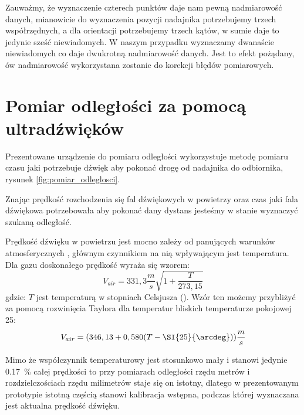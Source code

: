 Zauważmy, że wyznaczenie czterech punktów daje nam pewną nadmiarowość
danych, mianowicie do wyznaczenia pozycji nadajnika potrzebujemy trzech współrzędnych,
a dla orientacji potrzebujemy trzech kątów, w sumie daje to jedynie sześć niewiadomych.
W naszym przypadku wyznaczamy dwanaście niewiadomych co daje dwukrotną nadmiarowość danych.
Jest to efekt pożądany, ów nadmiarowość wykorzystana zostanie do korekcji błędów pomiarowych.


\section{Pomiar odległości za pomocą ultradźwięków}

Prezentowane urządzenie do pomiaru odległości wykorzystuje metodę pomiaru czasu jaki 
potrzebuje dźwięk aby pokonać drogę od nadajnika do odbiornika,
rysunek \ref{fig:pomiar_odleglosci}.

Znając prędkość rozchodzenia się fal dźwiękowych w powietrzy oraz czas jaki fala dźwiękowa potrzebowała
aby pokonać dany dystans jesteśmy w stanie wyznaczyć szukaną odległość.

Prędkość dźwięku w powietrzu jest mocno zależy od panujących warunków atmosferycznych \cite{bib:soundSpeed},  
głównym czynnikiem na nią wpływającym jest temperatura.
Dla gazu doskonałego prędkość wyraża się wzorem:
\[
V_{air} = 331,3  \frac{m}{s}  \sqrt{1+\frac{T}{273,15}}
\]
gdzie: $T$ jest temperaturą w stopniach Celsjusza (\SI{}{\degC}).
Wzór ten możemy przybliżyć za pomocą rozwinięcia Taylora dla temperatur bliskich temperaturze pokojowej \SI{25}{\degC}:
\[
 V_{air} = (346,13  +  0,580(T - \SI{25}{\arcdeg})) \frac{m}{s}
\]

Mimo że współczynnik temperaturowy jest stosunkowo mały i stanowi jedynie \SI{0,17}{\%} całej prędkości
to przy pomiarach odległości rzędu metrów i rozdzielczościach rzędu milimetrów staje się on istotny, 
dlatego w prezentowanym prototypie istotną częścią stanowi kalibracja wstępna, podczas której
wyznaczana jest aktualna prędkość dźwięku.






